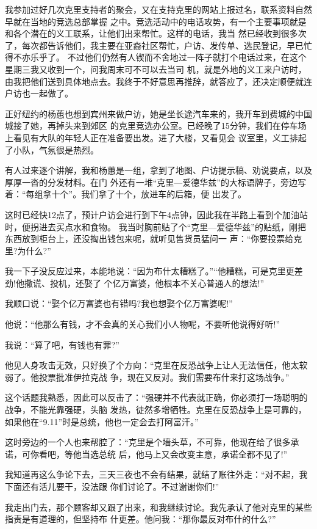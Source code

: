 ﻿\documentclass[11pt]{article}
\begin{document}
我参加过好几次克里支持者的聚会，又在支持克里的网站上报过名，联系资料自然早就在当地的竞选总部掌握
之中。竞选活动中的电话攻势，有一个主要事项就是和各个潜在的义工联系，让他们出来帮忙。这样的电话，我当
然已经收到很多次了，每次都告诉他们，我主要在亚裔社区帮忙，户访、发传单、选民登记，早已忙得不亦乐乎了。
不过他们仍然有人锲而不舍地过一阵子就打个电话过来，在这个星期三我又收到一个，问我周末可不可以去当司
机，就是外地的义工来户访时，由我把他们送到具体地点去。我终于不好意思再推辞，就答应了，还决定顺便就连
户访也一起做了。

正好纽约的杨蕙也想到宾州来做户访，她是坐长途汽车来的，我开车到费城的中国城接了她，再掉头来到郊区
的克里竞选办公室。已经晚了15分钟，我们在停车场上看见有大队的年轻人正在准备要出发。进了大楼，又看见会
议室里，义工排起了小队，气氛很是热烈。

有人过来逐个讲解，我和杨蕙是一组，拿到了地图、户访提示稿、劝说要点，以及厚厚一沓的分发材料。在门
外还有一堆``克里---爱德华兹''的大标语牌子，旁边写着：``每组拿十个''。我们拿了十个，放进车的后箱，便
出发了。

这时已经快12点了，预计户访会进行到下午4点钟，因此我在半路上看到个加油站时，便拐进去买点水和食物。
我当时胸前贴了个``克里---爱德华兹''的贴纸，刚把东西放到柜台上，还没掏出钱包来呢，就听见售货员猛问一
声：``你要投票给克里?为什么?''

我一下子没反应过来，本能地说：``因为布什太糟糕了。''``他糟糕，可是克里更差劲!他撒谎、投机，还娶了
个亿万富婆，他根本不关心普通人的想法!''

我顺口说：``娶个亿万富婆也有错吗?我也想娶个亿万富婆呢!''

他说：``他那么有钱，才不会真的关心我们小人物呢，不要听他说得好听!''

我说：``算了吧，有钱也有罪?''

他见人身攻击无效，只好换了个方向：``克里在反恐战争上让人无法信任，他太软弱了。他投票批准伊拉克战
争，现在又反对。我们需要布什来打这场战争。''

这个话题我熟悉，因此可以反击了：``强硬并不代表就正确，你必须打一场聪明的战争，不能光靠强硬，头脑
发热，徒然多增牺牲。克里在反恐战争上是可靠的，如果他在``9.11''时是总统，他也一定会去打阿富汗。''

这时旁边的一个人也来帮腔了：``克里是个墙头草，不可靠，他现在给了很多承诺，可你看吧，等他当选总统
后，他马上又会改变主意，承诺全都不见了!''

我知道再这么争论下去，三天三夜也不会有结果，就结了账往外走：``对不起，我下面还有活儿要干，没法跟
你们讨论了。不过谢谢你们!''

我走出门去，那个顾客却又跟了出来，和我继续讨论。我先承认了他对克里的某些指责是有道理的，但坚持布
什更差。他问我：``那你最反对布什的什么?''
\end{document}
